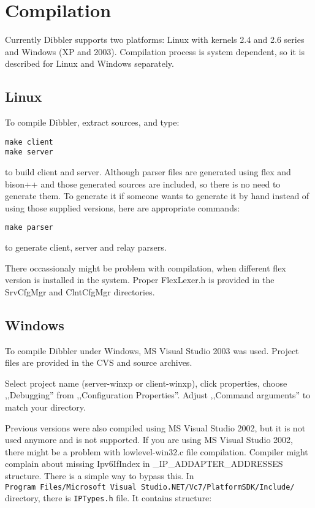
\section{Compilation}
Currently Dibbler supports two platforms: Linux with kernels 2.4 and
2.6 series and Windows (XP and 2003). Compilation process is system
dependent, so it is described for Linux and Windows separately.

\subsection{Linux}
To compile Dibbler, extract sources, and type:
\begin{verbatim}
make client
make server
\end{verbatim}
to build client and server. Although parser files are generated using
flex and bison++ and those generated sources are included, so there is
no need to generate them. To generate it if someone wants to generate it
by hand instead of using those supplied versions, here are appropriate
commands:
\begin{verbatim}
make parser
\end{verbatim}
to generate client, server and relay parsers.

There occassionaly might be problem with compilation, when different
flex version is installed in the system. Proper FlexLexer.h is
provided in the SrvCfgMgr and ClntCfgMgr directories.

\subsection{Windows}
To compile Dibbler under Windows, MS Visual Studio 2003 was
used. Project files are provided in the CVS and source archives.

Select project name (server-winxp or client-winxp), click properties,
choose ,,Debugging'' from ,,Configuration Properties''. Adjust ,,Command
arguments'' to match your directory.

Previous versions were also compiled using MS Visual Studio 2002, but
it is not used anymore and is not supported. If you are using MS
Visual Studio 2002, there might be a problem with
lowlevel-win32.c file compilation. Compiler might complain about
missing Ipv6IfIndex in \_IP\_ADDAPTER\_ADDRESSES structure. There is a simple way
to bypass this.  In \\
\verb+Program Files/Microsoft Visual Studio.NET/Vc7/PlatformSDK/Include/+ 
directory, there is \verb+IPTypes.h+ file. It contains structure:

